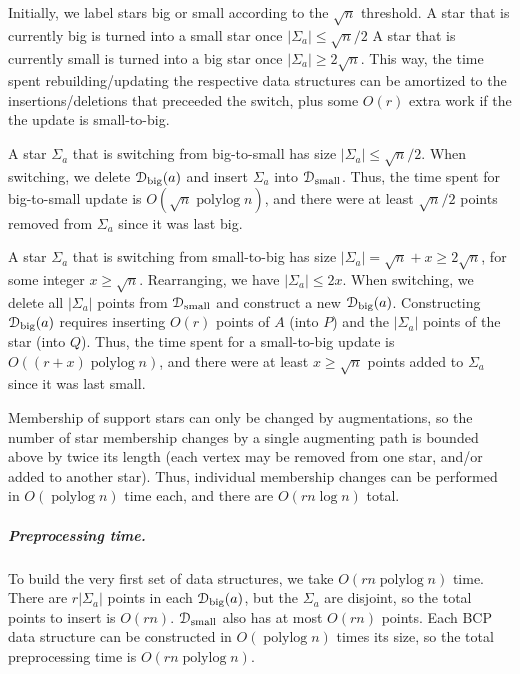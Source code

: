 \documentclass[a4paper,UKenglish]{socg-lipics-v2018}
\def\polylog{\mathop{\mathrm{polylog}}}
\def\abs#1{\mathopen| #1 \mathclose|}		%
\theoremstyle{plain}
\numberwithin{figure}{section}
\renewcommand{\paragraph}{\subparagraph}
\begin{document}
\begin{toappendix}

Initially, we label stars big or small according to the $\sqrt{n}$ threshold.
A star that is currently big is turned into a small star once
$\abs{\Sigma_a} \leq \sqrt{n}/2$
A star that is currently small is turned into a big star once
$\abs{\Sigma_a} \geq 2\sqrt{n}$.
This way, the time spent rebuilding/updating the respective data structures
can be amortized to the insertions/deletions that preceeded the switch, plus
some $O(r)$ extra work if the the update is small-to-big.

A star $\Sigma_a$ that is switching from big-to-small has size
$\abs{\Sigma_a} \leq \sqrt{n}/2$.
When switching, we delete $\EuScript{D}_\text{big}(a)$ and insert $\Sigma_a$
into $\EuScript{D}_\text{small}$.
Thus, the time spent for big-to-small update is $O(\sqrt{n}\polylog n)$,
and there were at least $\sqrt{n}/2$ points removed from $\Sigma_a$ since it
was last big.

A star $\Sigma_a$ that is switching from small-to-big has size
$\abs{\Sigma_a} = \sqrt{n} + x \geq 2\sqrt{n}$, for some integer
$x \geq \sqrt{n}$.
Rearranging, we have $\abs{\Sigma_a} \leq 2x$.
When switching, we delete all $\abs{\Sigma_a}$ points from
$\EuScript{D}_\text{small}$ and construct a new $\EuScript{D}_\text{big}(a)$.
Constructing $\EuScript{D}_\text{big}(a)$ requires inserting $O(r)$ points of
$A$ (into $P$) and the $\abs{\Sigma_a}$ points of the star (into $Q$).
Thus, the time spent for a small-to-big update is $O((r + x)\polylog n)$,
and there were at least $x \geq \sqrt{n}$ points added to $\Sigma_a$ since it
was last small.

\end{toappendix}

Membership of support stars can only be changed by augmentations,
so the number of star membership changes by a single augmenting path is
bounded above by twice its length (each vertex may be removed from one star,
and/or added to another star).
Thus, individual membership changes can be performed in $O(\polylog n)$ time
each, and there are $O(rn\log n)$ total.

\paragraph{Preprocessing time.}
To build the very first set of data structures, we take $O(rn\polylog n)$ time.
There are $r\abs{\Sigma_a}$ points in each $\EuScript{D}_\text{big}(a)$,
but the $\Sigma_a$ are disjoint, so the total points to insert is $O(rn)$.
$\EuScript{D}_\text{small}$ also has at most $O(rn)$ points.
Each BCP data structure can be constructed in $O(\polylog n)$ times its size,
so the total preprocessing time is $O(rn\polylog n)$.
\end{document}
